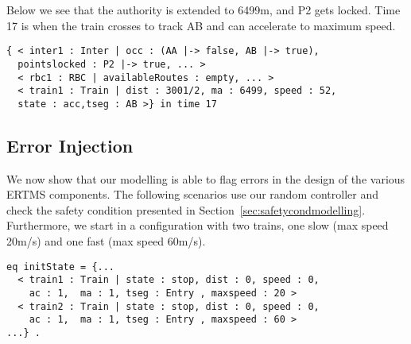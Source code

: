 Below we see that the authority is extended to 6499m, and P2 gets
locked. Time 17 is when the train crosses to track AB and can
accelerate to maximum speed.
\begin{lstlisting}
{ < inter1 : Inter | occ : (AA |-> false, AB |-> true),
  pointslocked : P2 |-> true, ... >
  < rbc1 : RBC | availableRoutes : empty, ... >
  < train1 : Train | dist : 3001/2, ma : 6499, speed : 52,
  state : acc,tseg : AB >} in time 17
\end{lstlisting}




\subsection{Error Injection}
\label{sec:errorInjection}
We now show that our modelling is able to flag errors in the design of
the various ERTMS components.  The following scenarios use our random
controller and check the safety condition presented in
Section~\ref{sec:safetycondmodelling}.  Furthermore, we start in a
configuration with two trains, one slow (max speed 20m/s) and one
fast (max speed 60m/s).

\begin{lstlisting}
eq initState = {...
  < train1 : Train | state : stop, dist : 0, speed : 0,
    ac : 1,  ma : 1, tseg : Entry , maxspeed : 20 >
  < train2 : Train | state : stop, dist : 0, speed : 0,
    ac : 1,  ma : 1, tseg : Entry , maxspeed : 60 >                        
...} .
\end{lstlisting}


